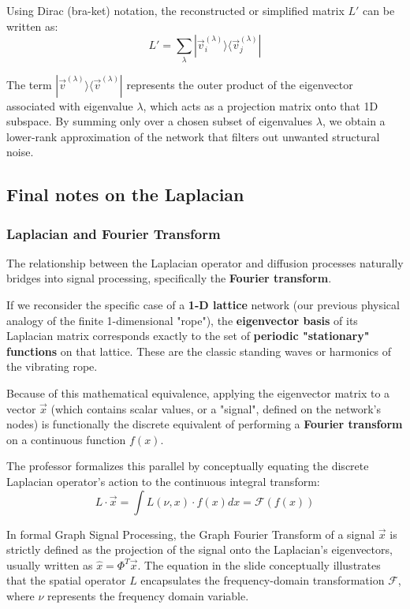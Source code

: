 Using Dirac (bra-ket) notation, the reconstructed or simplified matrix \( L' \) can be written as:
\[
    L' = \sum_{\lambda} | \vec{v}_i^{(\lambda)} \rangle \langle \vec{v}_j^{(\lambda)} |
\]
\begin{remark}
    The term \( | \vec{v}^{(\lambda)} \rangle \langle \vec{v}^{(\lambda)} | \) represents the outer product of the eigenvector associated with eigenvalue \( \lambda \), which acts as a projection matrix onto that 1D subspace. By summing only over a chosen subset of eigenvalues \( \lambda \), we obtain a lower-rank approximation of the network that filters out unwanted structural noise.
\end{remark}

\subsection{Final notes on the Laplacian}

\subsubsection{Laplacian and Fourier Transform}
The relationship between the Laplacian operator and diffusion processes naturally bridges into signal processing, specifically the \textbf{Fourier transform}.

If we reconsider the specific case of a \textbf{1-D lattice} network (our previous physical analogy of the finite 1-dimensional "rope"), the \textbf{eigenvector basis} of its Laplacian matrix corresponds exactly to the set of \textbf{periodic "stationary" functions} on that lattice. These are the classic standing waves or harmonics of the vibrating rope.

Because of this mathematical equivalence, applying the eigenvector matrix to a vector \( \vec{x} \) (which contains scalar values, or a "signal", defined on the network's nodes) is functionally the discrete equivalent of performing a \textbf{Fourier transform} on a continuous function \( f(x) \).

The professor formalizes this parallel by conceptually equating the discrete Laplacian operator's action to the continuous integral transform:
\[
    L \cdot \vec{x} = \int L(\nu, x) \cdot f(x)dx = \mathcal{F}(f(x))
\]
\begin{remark}
    In formal Graph Signal Processing, the Graph Fourier Transform of a signal \( \vec{x} \) is strictly defined as the projection of the signal onto the Laplacian's eigenvectors, usually written as \( \hat{x} = \Phi^T \vec{x} \). The equation in the slide conceptually illustrates that the spatial operator \( L \) encapsulates the frequency-domain transformation \( \mathcal{F} \), where \( \nu \) represents the frequency domain variable.
\end{remark}

